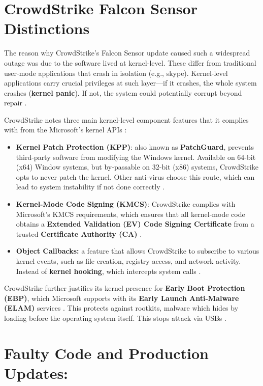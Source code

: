 \section{CrowdStrike Falcon Sensor Distinctions}

The reason why CrowdStrike's Falcon Sensor update caused such a widespread outage was due to
the software lived at kernel-level. These differ from traditional user-mode applications that crash in isolation (e.g., skype).
Kernel-level applications carry crucial privileges at such layer---if it crashes, the whole system crashes (\textbf{kernel panic}).
If not, the system could potentially corrupt beyond repair \cite{awati_kernel_panic}.

CrowdStrike notes three main kernel-level component features that it complies with from the Microsoft's kernel APIs \cite{ionescu_kernel_access_2024}:
\begin{itemize}
    \item \textbf{Kernel Patch Protection (KPP)}: also known as \textbf{PatchGuard}, prevents third-party software from modifying the Windows kernel.
          Available on 64-bit (x64) Window systems, but by-passable on 32-bit (x86) systems, CrowdStrike opts to never patch the kernel. Other
          anti-virus choose this route, which can lead to system instability if not done correctly \cite{wikipedia_kpp}.
    \item \textbf{Kernel-Mode Code Signing (KMCS)}: CrowdStrike complies with Microsoft's KMCS requirements, which ensures that all kernel-mode code obtains a
          \textbf{Extended Validation (EV) Code Signing Certificate} from a trusted \textbf{Certificate Authority (CA)} \cite{microsoft_kmcs}\cite{reasonlabs_kernel_hooking}.
    \item \textbf{Object Callbacks:} a feature that allows CrowdStrike to subscribe to various kernel events, such as file creation, registry access, and network activity.
          Instead of \textbf{kernel hooking}, which intercepts system calls \cite{microsoft_obregistercallbacks}.
\end{itemize}

CrowdStrike further justifies its kernel presence for \textbf{Early Boot Protection (EBP)}, which
Microsoft supports with its \textbf{Early Launch Anti-Malware (ELAM)} services \cite{ionescu_kernel_access_2024}. This protects against rootkits,
malware which hides by loading before the operating system itself. This stops attack via USBs \cite{baker_rootkits_2023}.

\section{Faulty Code and Production Updates:}


